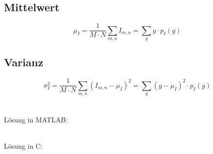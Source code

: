 \subsection{Mittelwert}
\[
	\mu_I = \frac{1}{M \cdot N} \sum_{m,n}I_{m,n} = \sum_{g} g \cdot p_I(g)
\]

\subsection{Varianz}
\[
	\sigma^2_I = \frac{1}{M \cdot N} \sum_{m,n}\left( I_{m,n} - \mu_I \right)^2 = \sum_{g}(g - \mu_I)^2 \cdot p_I(g)
\]\\\\
Lösung in MATLAB:
\lstset{language=Matlab}

~\\
Lösung in C:
\lstset{language=C}
